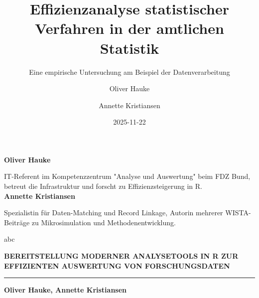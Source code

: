 \documentclass[
  ngerman,
  10pt,
  twocolumn]{article}
\title{Effizienzanalyse statistischer Verfahren in der amtlichen
Statistik}
\subtitle{Eine empirische Untersuchung am Beispiel der
Datenverarbeitung}
\author{Oliver Hauke \and Annette Kristiansen}
\date{2025-11-22}
\begin{document}
\maketitle

\begin{titlepage}
\thispagestyle{empty}
\onecolumn


\vspace*{1cm}

\begin{minipage}[t]{7cm}
\raggedright
\small
{\color{wistaBlue}\textbf{Oliver Hauke}}

IT-Referent im Kompetenzzentrum "Analyse und Auswertung" beim FDZ Bund, betreut die Infrastruktur und forscht zu Effizienzsteigerung in R.\\[0.5cm]

{\color{wistaBlue}\textbf{Annette Kristiansen}}

Spezialistin für Daten-Matching und Record Linkage, Autorin mehrerer WISTA-Beiträge zu Mikrosimulation und Methodenentwicklung.

abc

\end{minipage}%
\hfill%
\begin{minipage}[t]{9cm}
\raggedright

{\LARGE\bfseries\color{wistaDarkGray}BEREITSTELLUNG MODERNER ANALYSETOOLS IN R ZUR EFFIZIENTEN AUSWERTUNG VON FORSCHUNGSDATEN}

\vspace{0.5cm}


\vspace{0.5cm}

{\color{wistaBlue}\rule{\linewidth}{1.5pt}}

\vspace{0.5cm}

{\large\color{wistaDarkGray}\bfseries Oliver Hauke, Annette Kristiansen}


\end{minipage}
\end{titlepage}
\end{document}
